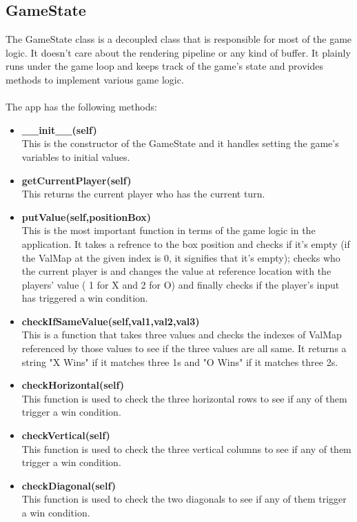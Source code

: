 \documentclass[12pt]{article}
\begin{document}
\subsection{GameState}
The GameState class is a decoupled class that is responsible for most of the game logic. It doesn't care about the rendering pipeline or any
kind of buffer. It plainly runs under the game loop and keeps track of the game's state and provides methods to implement various game logic.
\\\\
The app has the following methods:
\begin{itemize}
    \item \textbf{\_\_init\_\_(self)}\\ This is the constructor of the GameState and it handles setting the game's variables to initial values.
    \item \textbf{getCurrentPlayer(self)}\\ This returns the current player who has the current turn.
    \item \textbf{putValue(self,positionBox)}\\ This is the most important function in terms of the game logic in the application. It takes a refrence to the box position and checks if it's empty (if the ValMap at the given index is 0, it signifies that it's empty); checks who the current player is and changes the value at reference location with the players' value ( 1 for X and 2 for O) and finally checks if the player's input has triggered a win condition.
    \item \textbf{checkIfSameValue(self,val1,val2,val3)}\\ This is a function that takes three values and checks the indexes of ValMap referenced by those values to see if the three values are all same. It returns a string "X Wins" if it matches three 1s and "O Wins" if it matches three 2s.
    \item \textbf{checkHorizontal(self)}\\ This function is used to check the three horizontal rows to see if any of them trigger a win condition.
    \item \textbf{checkVertical(self)}\\ This function is used to check the three vertical columns to see if any of them trigger a win condition.
    \item \textbf{checkDiagonal(self)}\\ This function is used to check the two diagonals to see if any of them trigger a win condition.

\end{itemize}
\end{document}
